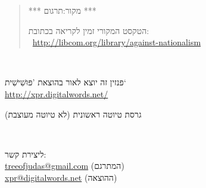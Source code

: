 \begin{center}

\begin{quote}
	*** מקור:תרגום ***

	הטקסט המקורי זמין לקריאה בכתובת:\\
	~\hfill	\url{http://libcom.org/library/against-nationalism}\hfill~
\end{quote}

\vfill
~

פנזין זה יוצא לאור בהוצאת ’פּוּשִׁישִׁית‘\\
\url{http://xpr.digitalwords.net/}


גרסת טיוטה ראשונית (לא טיוטה מעוצבת)

\vfill

~

\vfill

\middlelinenormal

ליצירת קשר:\\
\url{treeofjudas@gmail.com} (המתרגם)\\
\url{xpr@digitalwords.net} (ההוצאה)

\vfill

\middlelinenormal

\end{center}
